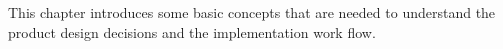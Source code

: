 This chapter introduces some basic concepts that are needed to understand the product design decisions and the implementation work flow.
